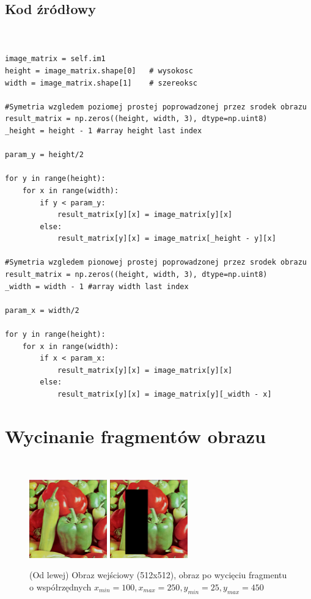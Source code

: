 \documentclass[final,a4paper,openany,12pt]{mwbk}
\begin{document}
\subsection*{Kod źródłowy}

\begin{lstlisting}[caption= Symetrie względem zadanej prostej]


image_matrix = self.im1
height = image_matrix.shape[0]   # wysokosc
width = image_matrix.shape[1]    # szereoksc

#Symetria wzgledem poziomej prostej poprowadzonej przez srodek obrazu
result_matrix = np.zeros((height, width, 3), dtype=np.uint8)
_height = height - 1 #array height last index

param_y = height/2

for y in range(height):
    for x in range(width): 
        if y < param_y:
            result_matrix[y][x] = image_matrix[y][x]
        else:
            result_matrix[y][x] = image_matrix[_height - y][x]

#Symetria wzgledem pionowej prostej poprowadzonej przez srodek obrazu
result_matrix = np.zeros((height, width, 3), dtype=np.uint8)
_width = width - 1 #array width last index

param_x = width/2

for y in range(height):
    for x in range(width): 
        if x < param_x:
            result_matrix[y][x] = image_matrix[y][x]
        else:
            result_matrix[y][x] = image_matrix[y][_width - x]

\end{lstlisting}
\newpage


\section{ Wycinanie fragmentów obrazu}
\hfill\\
\indent

\begin{figure}[H]
	\begin{center}
		\includegraphics[width=0.3\textwidth]{1/1Geo_Cut_Original}
		\includegraphics[width=0.3\textwidth]{1/1Geo_Cut_Result}
	\end{center}
	\caption{(Od lewej) Obraz wejściowy (512x512), obraz po wycięciu fragmentu o współrzędnych $x_{min}=100, x_{max}=250, y_{min}=25, y_{max}=450$ }
\end{figure}
\end{document}
